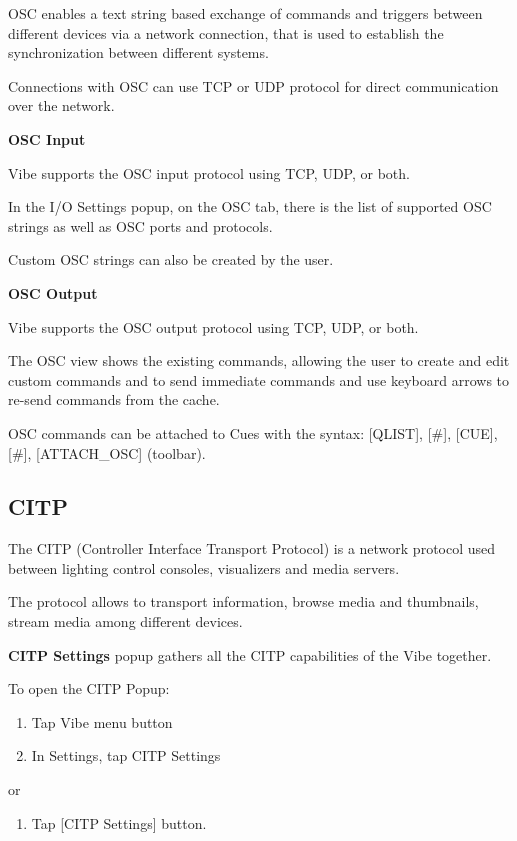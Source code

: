 \documentclass[
]{article}
\providecommand{\tightlist}{%
  \setlength{\itemsep}{0pt}\setlength{\parskip}{0pt}}
\begin{document}
OSC enables a text string based exchange of commands and triggers between different devices via a network connection, that is used to establish the synchronization between different systems.

Connections with OSC can use TCP or UDP protocol for direct communication over the network.

\textbf{OSC Input}

Vibe supports the OSC input protocol using TCP, UDP, or both.

In the I/O Settings popup, on the OSC tab, there is the list of supported OSC strings as well as OSC ports and protocols.

Custom OSC strings can also be created by the user.

\textbf{OSC Output}

Vibe supports the OSC output protocol using TCP, UDP, or both.

The OSC view shows the existing commands, allowing the user to create and edit custom commands and to send immediate commands and use keyboard arrows to re-send commands from the cache.

OSC commands can be attached to Cues with the syntax:
{[}QLIST{]}, {[}\#{]}, {[}CUE{]}, {[}\#{]}, {[}ATTACH\_OSC{]} (toolbar).

\hypertarget{CITP-17.6}{%
\subsection{CITP}\label{CITP-17.6}}

The CITP (Controller Interface Transport Protocol) is a network protocol used between lighting control consoles, visualizers and media servers.

The protocol allows to transport information, browse media and thumbnails, stream media among different devices.

\textbf{CITP Settings} popup gathers all the CITP capabilities of the Vibe together.

To open the CITP Popup:

\begin{enumerate}
\def\labelenumi{\arabic{enumi}.}
\item
  Tap Vibe menu button
\item
  In Settings, tap CITP Settings
\end{enumerate}

or

\begin{enumerate}
\def\labelenumi{\arabic{enumi}.}
\tightlist
\item
  Tap {[}CITP Settings{]} button.
\end{enumerate}
\end{document}
